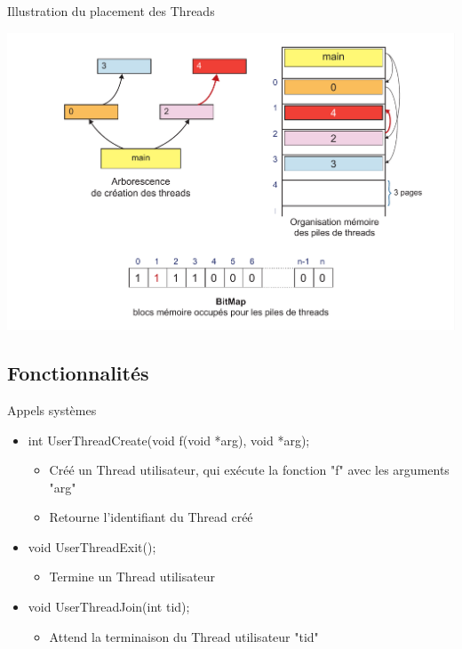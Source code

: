\documentclass{beamer}
\begin{document}
\begin{frame}{Illustration du placement des Threads}
  	\begin{center}
	  	\includegraphics[scale=0.24]{images/FS5.png}
  	\end{center}
\end{frame}


\subsection{Fonctionnalités}
\begin{frame}
	\begin{block}{Appels systèmes}
		\begin{itemize}
			\item<1-> int UserThreadCreate(void f(void *arg), void *arg);
			\begin{itemize}
				\item<1-> Créé un Thread utilisateur, qui exécute la fonction "f" avec les arguments "arg"
				\item<1-> Retourne l'identifiant du Thread créé
			\end{itemize}
			\item<2-> void UserThreadExit();
			\begin{itemize}
				\item<1-> Termine un Thread utilisateur
			\end{itemize}
			\item<3-> void UserThreadJoin(int tid);
			\begin{itemize}
				\item<1-> Attend la terminaison du Thread utilisateur "tid"
			\end{itemize}
		\end{itemize}
	\end{block}
\end{frame}
\end{document}
